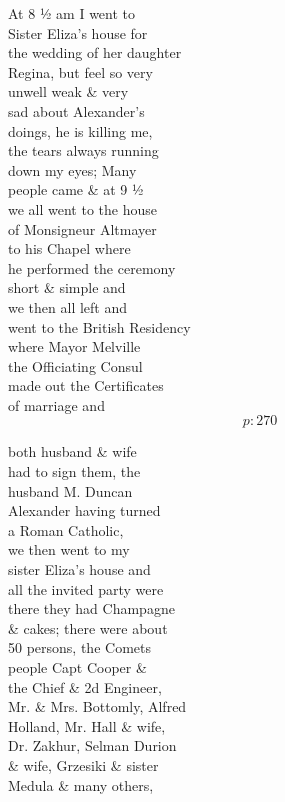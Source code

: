 \documentclass{report}
\begin{document}
	\par{
 	At 8 ½ am I went to\ \\Sister Eliza’s house for\ \\the wedding of her daughter\ \\Regina, but feel so very\ \\unwell weak \& very\ \\sad about Alexander’s\ \\doings, he is killing me,\ \\the tears always running\ \\down my eyes; Many\ \\people came \& at 9 ½\ \\we all went to the house\ \\of Monsigneur Altmayer\ \\to his Chapel where\ \\he performed the ceremony\ \\short \& simple and\ \\we then all left and\ \\went to the British Residency\ \\where Mayor Melville\ \\the Officiating Consul\ \\made out the Certificates\ \\of marriage and\ \\
  \[p: 270 \]

	}


	\par{
 	both husband \& wife\ \\had to sign them, the\ \\husband M. Duncan\ \\Alexander having turned\ \\a Roman Catholic,\ \\we then went to my\ \\sister Eliza’s house and\ \\all the invited party were\ \\there they had Champagne\ \\\& cakes; there were about\ \\50 persons, the Comets\ \\people Capt Cooper \&\ \\the Chief \& 2d Engineer,\ \\Mr. \& Mrs. Bottomly, Alfred\ \\Holland, Mr. Hall \& wife,\ \\Dr. Zakhur, Selman Durion\ \\\& wife, Grzesiki \& sister\ \\Medula \& many others,\ \\
	}
\end{document}
